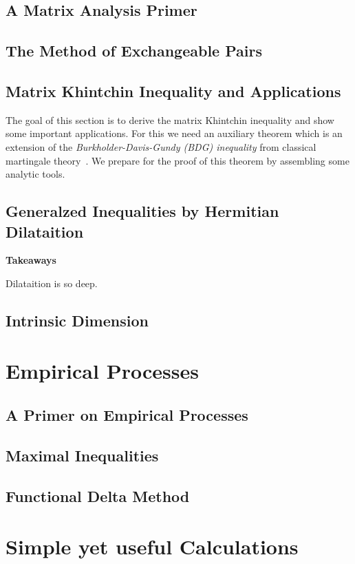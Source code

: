\documentclass[12pt]{scrreport}
\newenvironment{takeaways}
  {
   \begin{lrbox}{\selvestebox}%
   \begin{minipage}{15cm}
     \textbf{Takeaways}
   }
  {\end{minipage}\end{lrbox}%
   \begin{center}
\setlength\fboxsep{.5cm}
   \colorbox[HTML]{F8E0E0}{\usebox{\selvestebox}}
   \end{center}}
\theoremstyle{remark}
\theoremstyle{plain}
\begin{document}
  \section{A Matrix Analysis Primer}
  
  \section{The Method of Exchangeable Pairs}
  
 \section{Matrix Khintchin Inequality and Applications}
 The goal of this section is to derive the matrix Khintchin inequality and show some important applications.
 For this we need an auxiliary theorem which is an extension of the 
 \textit{Burkholder-Davis-Gundy (BDG) inequality} from classical martingale theory~\cite{Burkholder1973}.
  We prepare for the proof of this theorem by assembling some analytic tools.
  
  \section{Generalzed Inequalities by Hermitian Dilataition}
  
  
  \begin{takeaways}
    Dilataition is so deep.
    \lipsum[3]
  \end{takeaways}
  
  \section{Intrinsic Dimension}
  


\chapter{Empirical Processes}
\section{A Primer on Empirical Processes}


\section{Maximal Inequalities}


\section{Functional Delta Method}


\chapter{Simple yet useful Calculations} 



\printnomenclature

{}

\end{document}
